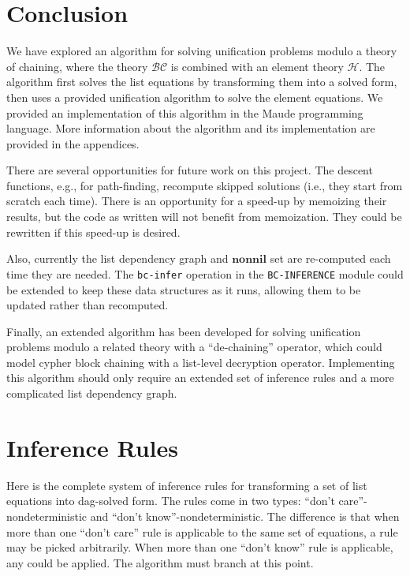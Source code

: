 \documentclass[11pt]{article}
\newcommand{\BC}{\mathcal{BC}}
\newcommand{\HH}{\mathcal{H}}
\newcommand{\Nonnil}{\mathbf{nonnil}}
\begin{document}
\section{Conclusion}\label{section:conclusion}

We have explored an algorithm for solving unification problems modulo a theory
of chaining, where the theory $\BC$ is combined with an element theory $\HH$.
The algorithm first solves the list equations by transforming them into a
solved form, then uses a provided unification algorithm to solve the element
equations. We provided an implementation of this algorithm in the Maude
programming language. More information about the algorithm and its
implementation are provided in the appendices.

There are several opportunities for future work on this project. The descent
functions, e.g., for path-finding, recompute skipped solutions (i.e., they
start from scratch each time). There is an opportunity for a speed-up by
memoizing their results, but the code as written will not benefit from
memoization. They could be rewritten if this speed-up is desired.

Also, currently the list dependency graph and $\Nonnil$ set are re-computed
each time they are needed. The \lstinline|bc-infer| operation in the
\lstinline|BC-INFERENCE| module could be extended to keep these data structures
as it runs, allowing them to be updated rather than recomputed.

Finally, an extended algorithm has been developed for solving unification
problems modulo a related theory with a ``de-chaining'' operator, which could
model cypher block chaining with a list-level decryption operator. Implementing
this algorithm should only require an extended set of inference rules and a
more complicated list dependency graph.



\clearpage
\appendix

\section{Inference Rules}\label{appendix:inference}

Here is the complete system of inference rules for transforming a set of list
equations into dag-solved form. The rules come in two types: ``don't
care''-nondeterministic and ``don't know''-nondeterministic. The difference
is that when more than one ``don't care'' rule is applicable to the same
set of equations, a rule may be picked arbitrarily. When more than one ``don't
know'' rule is applicable, any could be applied. The algorithm must branch at
this point.
\end{document}
